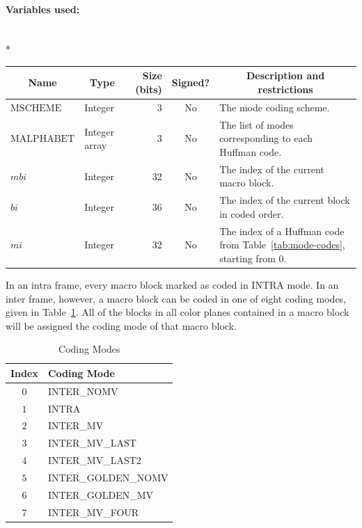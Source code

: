 \documentclass[9pt,letterpaper]{book}
\newcommand{\idx}[1]{{\ensuremath{\mathit{#1}}}}
\newcommand{\bi}{\idx{bi}}
\newcommand{\mbi}{\idx{mbi}}
\newcommand{\mi}{\idx{mi}}
\newcommand{\locvar}[1]{\ensuremath{\mathrm{#1}}}
\numberwithin{equation}{chapter}
\numberwithin{figure}{chapter}
\numberwithin{table}{chapter}
\begin{document}
\paragraph{Variables used:}\hfill\\*
\begin{tabularx}{\textwidth}{@{}llrcX@{}}\toprule
\multicolumn{1}{c}{Name} &
\multicolumn{1}{c}{Type} &
\multicolumn{1}{p{30pt}}{\centering Size (bits)} &
\multicolumn{1}{c}{Signed?} &
\multicolumn{1}{c}{Description and restrictions} \\\midrule\endhead
\locvar{MSCHEME}   & Integer &  3 & No & The mode coding scheme. \\
\locvar{MALPHABET} & \multicolumn{1}{p{40pt}}{Integer array}
                             &  3 & No & The list of modes corresponding to each
 Huffman code. \\
\locvar{\mbi}      & Integer & 32 & No & The index of the current macro
 block. \\
\locvar{\bi}       & Integer & 36 & No & The index of the current block in
 coded order. \\
\locvar{\mi}       & Integer & 32 & No & The index of a Huffman code from
 Table~\ref{tab:mode-codes}, starting from $0$. \\
\bottomrule\end{tabularx}
\medskip

In an intra frame, every macro block marked as coded in INTRA mode.
In an inter frame, however, a macro block can be coded in one of eight coding
 modes, given in Table~\ref{tab:coding-modes}.
All of the blocks in all color planes contained in a macro block will be
 assigned the coding mode of that macro block.

\begin{table}[htbp]
\begin{center}
\begin{tabular}{cl}\toprule
Index & Coding Mode \\\midrule
$0$   & INTER\_NOMV         \\
$1$   & INTRA               \\
$2$   & INTER\_MV           \\
$3$   & INTER\_MV\_LAST     \\
$4$   & INTER\_MV\_LAST2    \\
$5$   & INTER\_GOLDEN\_NOMV \\
$6$   & INTER\_GOLDEN\_MV   \\
$7$   & INTER\_MV\_FOUR     \\
\bottomrule\end{tabular}
\end{center}
\caption{Coding Modes}
\label{tab:coding-modes}
\end{table}
\end{document}

